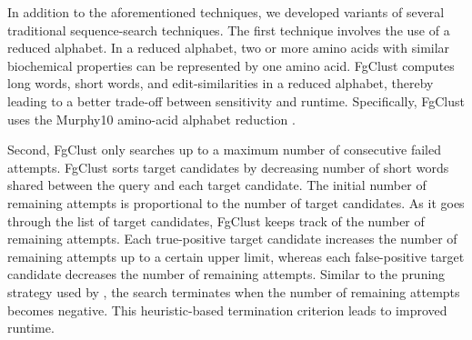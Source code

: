 \documentclass{bioinfo}
\begin{document}
\begin{methods}
In addition to the aforementioned techniques, we developed variants of several traditional sequence-search techniques.
The first technique involves the use of a reduced alphabet. 
In a reduced alphabet, two or more amino acids with similar biochemical properties can be represented by one amino acid.
FgClust computes long words, 
	short words,
	and edit-similarities in a reduced alphabet, thereby leading to a better trade-off between sensitivity and runtime.
Specifically, FgClust uses the Murphy10 amino-acid alphabet reduction \citep{murphy2000simplified}.

Second, FgClust only searches up to a maximum number of consecutive failed attempts.
FgClust sorts target candidates by decreasing number of 
short words
shared between the query and each target candidate.
The initial number of remaining attempts is proportional to the number of target candidates.
As it goes through the list of target candidates, FgClust keeps track of the number of remaining attempts.
Each true-positive target candidate increases the number of remaining attempts up to a certain upper limit, whereas each false-positive target candidate decreases the number of remaining attempts.
Similar to the pruning strategy used by \citet{edgar2010search}, the search terminates when the number of remaining attempts becomes negative.
This heuristic-based termination criterion leads to improved runtime.


\end{methods}
\end{document}
